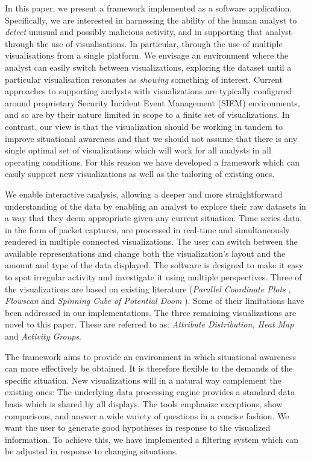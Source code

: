 In this paper, we present a framework implemented as a software application. Specifically, we are
interested in harnessing the ability of the human analyst to \textit{detect} unusual and possibly
malicious activity, and in supporting that analyst through the use of visualisations. In particular,
through the use of multiple visualisations from a single platform. We envisage an environment where
the analyst can easily switch between visualizations, exploring the dataset until a particular
visualisation resonates as \textit{showing} something of interest. Current approaches to supporting
analysts with visualizations are typically configured around proprietary Security Incident Event
Management (SIEM) environments, and so are by their nature limited in scope to a finite set of
visualizations. In contrast, our view is that the visualization should be working in tandem to
improve situational awareness and that we should not assume that there is any single optimal set of
visualizations which will work for all analysts in all operating conditions. For this reason we have
developed a framework which can easily support new visualizations as well as the tailoring of
existing ones.

We enable interactive analysis, allowing a deeper and more straightforward understanding of the data
by enabling an analyst to explore their raw datasets in a way that they deem appropriate given any
current situation. Time series data, in the form of packet captures, are processed in real-time and
simultaneously rendered in multiple connected visualizations. The user can switch between the
available representations and change both the visualization's layout and the amount and
type of the data displayed. The software is designed to make it easy to spot irregular
activity and investigate it using multiple perspectives. Three of the visualizations are based on
existing literature (\textit{Parallel Coordinate Plots} \cite{inselberg1985plane}, \textit{Flowscan}
\cite{plonka2000flowscan} and \textit{Spinning Cube of Potential Doom} \cite{lau2004spinning}). Some
of their limitations have been addressed in our implementations. The three remaining visualizations
are novel to this paper. These are referred to as: \textit{Attribute Distribution, Heat Map} and
\textit{Activity Groups}.

The framework aims to provide an environment in which situational awareness can more effectively be
obtained. It is therefore flexible to the demands of the specific situation. New visualizations will
in a natural way complement the existing ones: The underlying data processing engine provides a
standard data basis which is shared by all displays. The tools emphasize exceptions, show
comparisons, and answer a wide variety of questions in a concise fashion. We want the user to
generate good hypotheses in response to the visualized information. To achieve this, we have
implemented a filtering system which can be adjusted in response to changing situations. 

